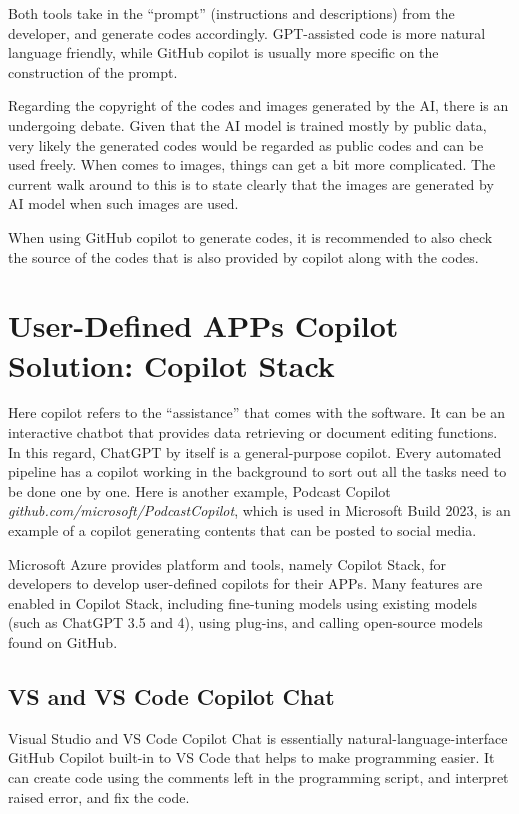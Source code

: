 Both tools take in the ``prompt'' (instructions and descriptions) from the developer, and generate codes accordingly. GPT-assisted code is more natural language friendly, while GitHub copilot is usually more specific on the construction of the prompt.

Regarding the copyright of the codes and images generated by the AI, there is an undergoing debate. Given that the AI model is trained mostly by public data, very likely the generated codes would be regarded as public codes and can be used freely. When comes to images, things can get a bit more complicated. The current walk around to this is to state clearly that the images are generated by AI model when such images are used.

When using GitHub copilot to generate codes, it is recommended to also check the source of the codes that is also provided by copilot along with the codes.

\section{User-Defined APPs Copilot Solution: Copilot Stack}

Here copilot refers to the ``assistance'' that comes with the software. It can be an interactive chatbot that provides data retrieving or document editing functions. In this regard, ChatGPT by itself is a general-purpose copilot. Every automated pipeline has a copilot working in the background to sort out all the tasks need to be done one by one. Here is another example, Podcast Copilot \textit{github.com/microsoft/PodcastCopilot}, which is used in Microsoft Build 2023, is an example of a copilot generating contents that can be posted to social media.

Microsoft Azure provides platform and tools, namely Copilot Stack, for developers to develop user-defined copilots for their APPs. Many features are enabled in Copilot Stack, including fine-tuning models using existing models (such as ChatGPT 3.5 and 4), using plug-ins, and calling open-source models found on GitHub.


\subsection{VS and VS Code Copilot Chat}

Visual Studio and VS Code Copilot Chat is essentially natural-language-interface GitHub Copilot built-in to VS Code that helps to make programming easier. It can create code using the comments left in the programming script, and interpret raised error, and fix the code.

